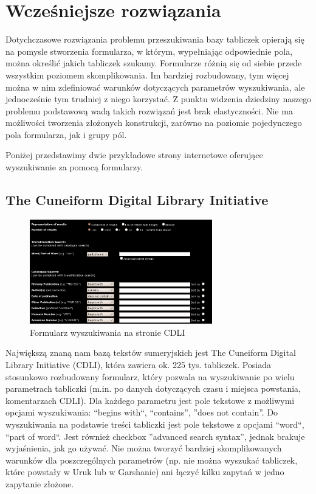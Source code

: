 \section{Wcześniejsze rozwiązania}\label{r:losers}


Dotychczasowe rozwiązania problemu przeszukiwania bazy tabliczek opierają się na pomysle stworzenia formularza,
w którym, wypełniając odpowiednie pola, można określić jakich tabliczek szukamy.
Formularze różnią się od siebie przede wszystkim poziomem skomplikowania.
Im bardziej rozbudowany, tym więcej można w nim zdefiniować warunków dotyczących parametrów wyszukiwania,
ale jednocześnie tym trudniej z niego korzystać.
Z punktu widzenia dziedziny naszego problemu podstawową wadą takich rozwiązań jest 
brak elastyczności. Nie ma możliwości tworzenia złożonych konstrukcji, 
zarówno na poziomie pojedynczego pola formularza, jak i grupy pól.


Poniżej przedstawimy dwie przykładowe strony internetowe oferujące wyszukiwanie za pomocą formularzy.


\subsection{The Cuneiform Digital Library Initiative \cite{cdli}}
\begin{figure}[h]
 \centering
 \includegraphics[width=300px]{../diagramy/cdli-search.png}
 \caption{Formularz wyszukiwania na stronie CDLI}
 \label{fig:cdli-search}
\end{figure}
Największą znaną nam bazą tekstów sumeryjskich jest The Cuneiform Digital Library Initiative (CDLI),
która zawiera ok. 225 tys. tabliczek.
Posiada stosunkowo rozbudowany formularz, 
który pozwala na wyszukiwanie po wielu parametrach tabliczki 
(m.in. po danych dotyczących czasu i miejsca powstania, komentarzach CDLI). 
Dla każdego parametru jest pole tekstowe z możliwymi opcjami wyszukiwania:
``begins with``, ``contains'', ''does not contain''.
Do wyszukiwania na podstawie treści tabliczki jest pole tekstowe z opcjami ``word``, ``part of word``.
Jest również checkbox ''advanced search syntax'', jednak brakuje wyjaśnienia, jak go używać.
Nie można tworzyć bardziej skomplikowanych warunków dla poszczególnych parametrów
(np. nie można wyszukać tabliczek, które powstały w Uruk lub w Garshanie)
ani łączyć kilku zapytań w jedno zapytanie złożone.

